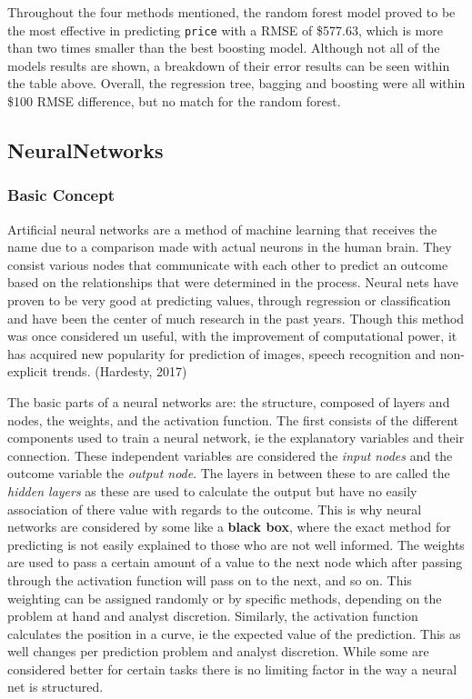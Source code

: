 \documentclass[
  paper=a4,
  ,captions=tableheading
]{scrartcl}
\begin{document}
Throughout the four methods mentioned, the random forest model proved to
be the most effective in predicting \texttt{price} with a RMSE of
\$577.63, which is more than two times smaller than the best boosting
model. Although not all of the models results are shown, a breakdown of
their error results can be seen within the table above. Overall, the
regression tree, bagging and boosting were all within \$100 RMSE
difference, but no match for the random forest.

\hypertarget{neuralnetworks}{%
\subsection{NeuralNetworks}\label{neuralnetworks}}

\hypertarget{basic-concept}{%
\subsubsection{Basic Concept}\label{basic-concept}}

Artificial neural networks are a method of machine learning that
receives the name due to a comparison made with actual neurons in the
human brain. They consist various nodes that communicate with each other
to predict an outcome based on the relationships that were determined in
the process. Neural nets have proven to be very good at predicting
values, through regression or classification and have been the center of
much research in the past years. Though this method was once considered
un useful, with the improvement of computational power, it has acquired
new popularity for prediction of images, speech recognition and
non-explicit trends. (Hardesty, 2017)

The basic parts of a neural networks are: the structure, composed of
layers and nodes, the weights, and the activation function. The first
consists of the different components used to train a neural network, ie
the explanatory variables and their connection. These independent
variables are considered the \emph{input nodes} and the outcome variable
the \emph{output node}. The layers in between these to are called the
\emph{hidden layers} as these are used to calculate the output but have
no easily association of there value with regards to the outcome. This
is why neural networks are considered by some like a \textbf{black box},
where the exact method for predicting is not easily explained to those
who are not well informed. The weights are used to pass a certain amount
of a value to the next node which after passing through the activation
function will pass on to the next, and so on. This weighting can be
assigned randomly or by specific methods, depending on the problem at
hand and analyst discretion. Similarly, the activation function
calculates the position in a curve, ie the expected value of the
prediction. This as well changes per prediction problem and analyst
discretion. While some are considered better for certain tasks there is
no limiting factor in the way a neural net is structured.
\end{document}
